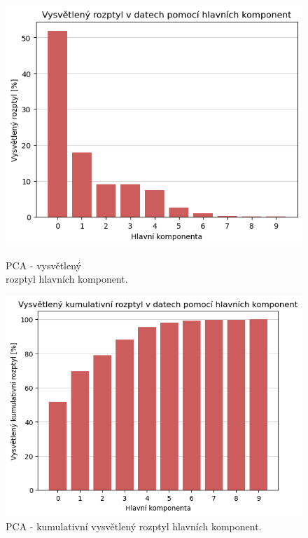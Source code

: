 \begin{figure}[h!]
    \centering
    \begin{minipage}{.5\textwidth}
      \centering
      \captionsetup{justification=centering}

      \includegraphics[width=.8\textwidth]{obrazky/zntb/pca-roztyl_komponetn.png}
      \caption{PCA - vysvětlený \\ rozptyl hlavních komponent.}
      \label{obr:nb:pca_roztyl_komponetn}
    \end{minipage}%
    \begin{minipage}{.5\textwidth}
      \centering
      \captionsetup{justification=centering}

      \includegraphics[width=.8\textwidth]{obrazky/zntb/pca-kum_roztyl_komponetn.png}
      \caption{PCA - kumulativní vysvětlený rozptyl hlavních komponent.}
      \label{obr:nb:pca_kum_roztyl_komponetn}
    \end{minipage}
    \end{figure}

